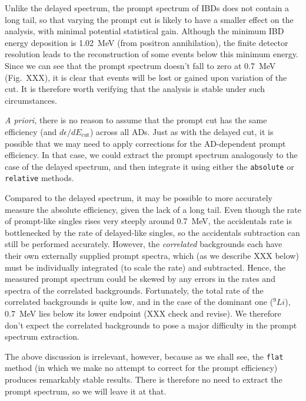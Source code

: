 \documentclass[../thesis.tex]{subfiles}
\begin{document}
Unlike the delayed spectrum, the prompt spectrum of IBDs does not contain a long tail, so that varying the prompt cut is likely to have a smaller effect on the analysis, with minimal potential statistical gain. Although the minimum IBD energy deposition is 1.02~MeV (from positron annihilation), the finite detector resolution leads to the reconstruction of some events below this minimum energy. Since we can see that the prompt spectrum doesn't fall to zero at 0.7~MeV (Fig.~XXX), it is clear that events will be lost or gained upon variation of the cut. It is therefore worth verifying that the analysis is stable under such circumstances.

\emph{A priori,} there is no reason to assume that the prompt cut has the same efficiency (and $d\epsilon/dE_{\mathrm{cut}}$) across all ADs. Just as with the delayed cut, it is possible that we may need to apply corrections for the AD-dependent prompt efficiency. In that case, we could extract the prompt spectrum analogously to the case of the delayed spectrum, and then integrate it using either the \texttt{absolute} or \texttt{relative} methods.

Compared to the delayed spectrum, it may be possible to more accurately measure the absolute efficiency, given the lack of a long tail. Even though the rate of prompt-like singles rises very steeply around 0.7~MeV, the accidentals rate is bottlenecked by the rate of delayed-like singles, so the accidentals subtraction can still be performed accurately. However, the \emph{correlated} backgrounds each have their own externally supplied prompt spectra, which (as we describe XXX below) must be individually integrated (to scale the rate) and subtracted. Hence, the measured prompt spectrum could be skewed by any errors in the rates and spectra of the correlated backgrounds. Fortunately, the total rate of the correlated backgrounds is quite low, and in the case of the dominant one ($^9Li$), 0.7~MeV lies below its lower endpoint (XXX check and revise). We therefore don't expect the correlated backgrounds to pose a major difficulty in the prompt spectrum extraction.

The above discussion is irrelevant, however, because as we shall see, the \texttt{flat} method (in which we make no attempt to correct for the prompt efficiency) produces remarkably stable results. There is therefore no need to extract the prompt spectrum, so we will leave it at that.
\end{document}
